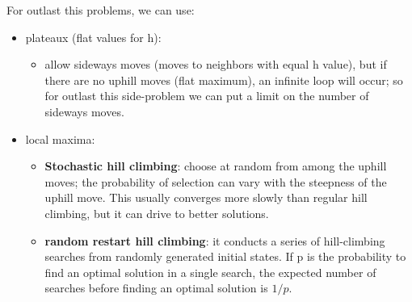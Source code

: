 \documentclass[12pt]{article}
\begin{document}
\begin{enumerate}[label=\textbf{II.\arabic*}]
    For outlast this problems, we can use:
    \begin{itemize}
        \item plateaux (flat values for h):
        \begin{itemize}
            \item allow sideways moves (moves to neighbors with equal h value), but if there are no uphill moves (flat maximum), 
            an infinite loop will occur; so for outlast this side-problem we can put a limit on the number of sideways moves.
        \end{itemize}
        \item local maxima:
        \begin{itemize}
            \item \textbf{Stochastic hill climbing}: choose at random from among the uphill moves; the probability of selection can vary with the steepness of the uphill move.
            This usually converges more slowly than regular hill climbing, but it can drive to better solutions.
            \item \textbf{random restart hill climbing}: 
            it conducts a series of hill-climbing searches from randomly generated initial states.
            If p is the probability to find an optimal solution in a single search, the expected number of searches before finding an optimal solution is $1/p$.
            

\end{itemize}
\end{itemize}
\end{enumerate}
\end{document}
